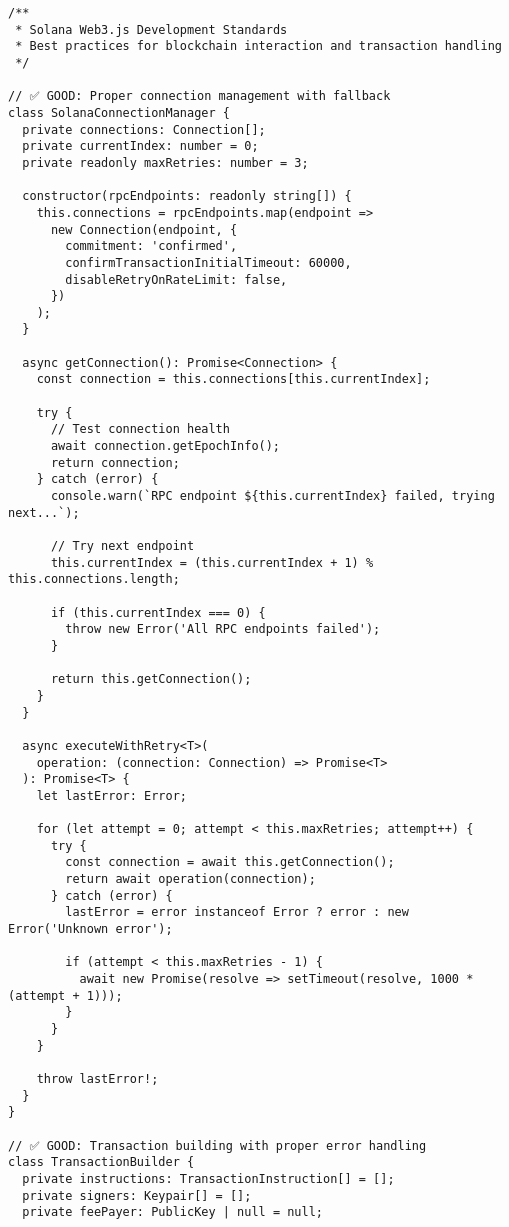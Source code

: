 \documentclass[11pt,a4paper]{article}
\begin{document}
\begin{lstlisting}[style=typescript, caption=Solana Web3.js Standards]
/**
 * Solana Web3.js Development Standards
 * Best practices for blockchain interaction and transaction handling
 */

// ✅ GOOD: Proper connection management with fallback
class SolanaConnectionManager {
  private connections: Connection[];
  private currentIndex: number = 0;
  private readonly maxRetries: number = 3;
  
  constructor(rpcEndpoints: readonly string[]) {
    this.connections = rpcEndpoints.map(endpoint => 
      new Connection(endpoint, {
        commitment: 'confirmed',
        confirmTransactionInitialTimeout: 60000,
        disableRetryOnRateLimit: false,
      })
    );
  }
  
  async getConnection(): Promise<Connection> {
    const connection = this.connections[this.currentIndex];
    
    try {
      // Test connection health
      await connection.getEpochInfo();
      return connection;
    } catch (error) {
      console.warn(`RPC endpoint ${this.currentIndex} failed, trying next...`);
      
      // Try next endpoint
      this.currentIndex = (this.currentIndex + 1) % this.connections.length;
      
      if (this.currentIndex === 0) {
        throw new Error('All RPC endpoints failed');
      }
      
      return this.getConnection();
    }
  }
  
  async executeWithRetry<T>(
    operation: (connection: Connection) => Promise<T>
  ): Promise<T> {
    let lastError: Error;
    
    for (let attempt = 0; attempt < this.maxRetries; attempt++) {
      try {
        const connection = await this.getConnection();
        return await operation(connection);
      } catch (error) {
        lastError = error instanceof Error ? error : new Error('Unknown error');
        
        if (attempt < this.maxRetries - 1) {
          await new Promise(resolve => setTimeout(resolve, 1000 * (attempt + 1)));
        }
      }
    }
    
    throw lastError!;
  }
}

// ✅ GOOD: Transaction building with proper error handling
class TransactionBuilder {
  private instructions: TransactionInstruction[] = [];
  private signers: Keypair[] = [];
  private feePayer: PublicKey | null = null;
  

\end{lstlisting}
\end{document}
